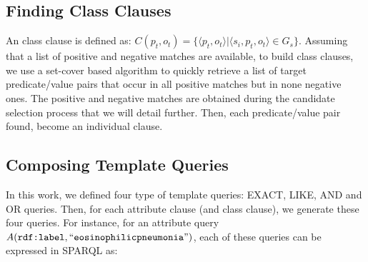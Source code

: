 
\subsection{Finding Class Clauses}
 
An class clause is defined as: $C(p_t,o_t)=\{\langle p_t,o_t \rangle | \langle s_i, p_t, o_t \rangle \in G_s \}$.  Assuming that a list of positive and negative matches are available, to build class clauses, we use a set-cover based algorithm \cite{DBLP:conf/soda/CarrDKM00} to quickly retrieve a list of target predicate/value pairs that occur in all positive matches but in none negative ones. The positive and negative matches are obtained during the candidate selection process that we will detail further. Then, each predicate/value pair found, become an individual clause.

\subsection{Composing Template Queries} 

In this work, we defined four type of template queries: EXACT, LIKE, AND and  OR queries.  Then, for each attribute clause (and class clause), we generate these four queries. For instance, for an attribute query $A(\verb+rdf:label+,``\verb+eosinophilic+  \verb+pneumonia+")$,  each of these queries can be expressed in SPARQL as: 

